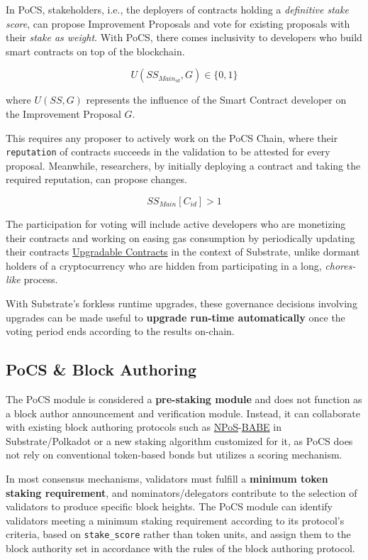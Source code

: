 \documentclass{article}
\begin{document}
In PoCS, stakeholders, i.e., the deployers of contracts holding a \textit{definitive stake score}, can propose Improvement Proposals and vote for existing proposals with their \textit{stake as weight}. With PoCS, there comes inclusivity to developers who build smart contracts on top of the blockchain.

\[
U(SS_{Main_{id}},G) \in \{ 0,1 \}
\]

where \(U(SS, G)\) represents the influence of the Smart Contract developer on the Improvement Proposal \(G\).

This requires any proposer to actively work on the PoCS Chain, where their \texttt{reputation} of contracts succeeds in the validation to be attested for every proposal. Meanwhile, researchers, by initially deploying a contract and taking the required reputation, can propose changes.

\[
SS_{Main}[C_{id}] > 1
\]

The participation for voting will include active developers who are monetizing their contracts and working on easing gas consumption by periodically updating their contracts \href{https://use.ink/basics/upgradeable-contracts/\#\#replacing-contract-code-with-set_code_hash}{Upgradable Contracts} in the context of Substrate, unlike dormant holders of a cryptocurrency who are hidden from participating in a long, \textit{chores-like} process.

With Substrate's forkless runtime upgrades, these governance decisions involving upgrades can be made useful to \textbf{upgrade run-time automatically} once the voting period ends according to the results on-chain.

\subsection{PoCS \& Block Authoring}

The PoCS module is considered a \textbf{pre-staking module} and does not function as a block author announcement and verification module. Instead, it can collaborate with existing block authoring protocols such as \href{https://wiki.polkadot.network/docs/learn-consensus#nominated-proof-of-stake}{NPoS}-\href{https://wiki.polkadot.network/docs/learn-consensus#block-production-babe}{BABE} in Substrate/Polkadot or a new staking algorithm customized for it, as PoCS does not rely on conventional token-based bonds but utilizes a scoring mechanism. 

In most consensus mechanisms, validators must fulfill a \textbf{minimum token staking requirement}, and nominators/delegators contribute to the selection of validators to produce specific block heights. The PoCS module can identify validators meeting a minimum staking requirement according to its protocol's criteria, based on \texttt{stake\_score} rather than token units, and assign them to the block authority set in accordance with the rules of the block authoring protocol. 
\end{document}
